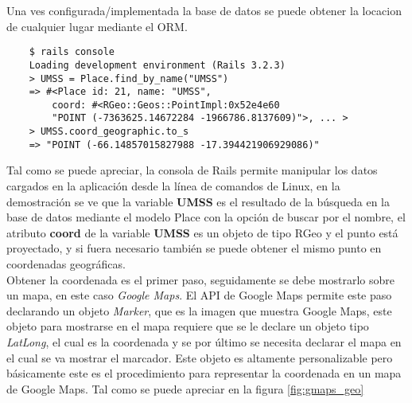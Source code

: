     Una ves configurada/implementada la base de datos se puede obtener la locacion de cualquier lugar mediante el ORM.

\begin{center}
  \begin{verbatim}
    $ rails console
    Loading development environment (Rails 3.2.3)
    > UMSS = Place.find_by_name("UMSS")
    => #<Place id: 21, name: "UMSS", 
        coord: #<RGeo::Geos::PointImpl:0x52e4e60 
        "POINT (-7363625.14672284 -1966786.8137609)">, ... >
    > UMSS.coord_geographic.to_s
    => "POINT (-66.14857015827988 -17.394421906929086)"
  \end{verbatim}
\end{center}

    Tal como se puede apreciar, la consola de Rails permite manipular los datos cargados en la aplicación desde la línea de comandos de Linux, en la demostración se ve que la variable \textbf{UMSS}  es el resultado de la búsqueda en la base de datos mediante el modelo Place con la opción de buscar por el nombre, el atributo \textbf{coord} de la variable \textbf{UMSS} es un objeto de tipo RGeo y  el punto está proyectado, y si fuera necesario también se puede obtener el mismo punto en coordenadas geográficas.\\

    Obtener la coordenada es el primer paso, seguidamente se debe mostrarlo sobre un mapa, en este caso \emph{Google Maps}. El API de Google Maps permite este paso declarando un objeto \emph{Marker}, que es la imagen que muestra Google Maps, este objeto para mostrarse en el mapa requiere que se le declare un objeto tipo \emph{LatLong}, el cual es la coordenada y se por \'ultimo se necesita declarar el mapa en el cual se va mostrar el marcador. Este objeto es altamente personalizable pero b\'asicamente este es el procedimiento para representar la coordenada en un mapa de Google Maps. Tal como se puede apreciar en la figura \ref{fig:gmaps_geo}\\

